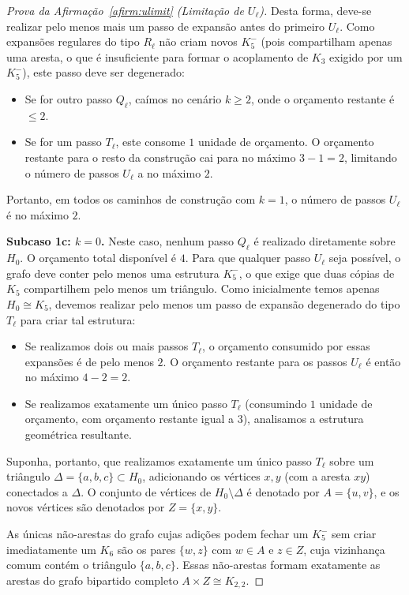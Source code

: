\documentclass[reqno, 12pt]{amsart}
\numberwithin{equation}{section}
\theoremstyle{plain}
\theoremstyle{definition}
\begin{document}
\begin{proof}[Prova da Afirmação~\ref{afirm:ulimit} (Limitação de $U_\ell$)]
    Desta forma, deve-se realizar pelo menos mais um passo de expansão antes do primeiro $U_\ell$.
    Como expansões regulares do tipo $R_\ell$ não criam novos $K_5^-$ (pois compartilham apenas uma
    aresta, o que é insuficiente para formar o acoplamento de $K_3$ exigido por um $K_5^-$), este passo
    deve ser degenerado:
    \begin{itemize}
        \item Se for outro passo $Q_\ell$, caímos no cenário $k \ge 2$, onde o orçamento restante é $\le 2$.
        \item Se for um passo $T_\ell$, este consome $1$ unidade de orçamento. O orçamento restante para o
              resto da construção cai para no máximo $3 - 1 = 2$, limitando o número de passos $U_\ell$ a no máximo $2$.
    \end{itemize}
    Portanto, em todos os caminhos de construção com $k = 1$, o número de passos $U_\ell$ é no máximo $2$.

    \medskip
    \noindent\textbf{Subcaso 1c: $k = 0$.}
    Neste caso, nenhum passo $Q_\ell$ é realizado diretamente sobre $H_0$. O orçamento total disponível é $4$.
    Para que qualquer passo $U_\ell$ seja possível, o grafo deve conter pelo menos uma estrutura $K_5^-$,
    o que exige que duas cópias de $K_5$ compartilhem pelo menos um triângulo.
    Como inicialmente temos apenas $H_0 \cong K_5$, devemos realizar pelo menos um passo de expansão
    degenerado do tipo $T_\ell$ para criar tal estrutura:
    \begin{itemize}
        \item Se realizamos dois ou mais passos $T_\ell$, o orçamento consumido por essas expansões é
              de pelo menos $2$. O orçamento restante para os passos $U_\ell$ é então no máximo $4 - 2 = 2$.
        \item Se realizamos exatamente um único passo $T_\ell$ (consumindo $1$ unidade de orçamento, com
              orçamento restante igual a $3$), analisamos a estrutura geométrica resultante.
    \end{itemize}
    Suponha, portanto, que realizamos exatamente um único passo $T_\ell$ sobre um triângulo
    $\Delta = \{a,b,c\} \subset H_0$, adicionando os vértices $x, y$ (com a aresta $xy$) conectados a $\Delta$.
    O conjunto de vértices de $H_0 \setminus \Delta$ é denotado por $A = \{u,v\}$, e os novos vértices
    são denotados por $Z = \{x,y\}$.

    As únicas não-arestas do grafo cujas adições podem fechar um $K_5^-$ sem criar imediatamente um $K_6$
    são os pares $\{w,z\}$ com $w \in A$ e $z \in Z$, cuja vizinhança comum contém o triângulo $\{a,b,c\}$.
    Essas não-arestas formam exatamente as arestas do grafo bipartido completo $A \times Z \cong K_{2,2}$.


\end{proof}
\end{document}
